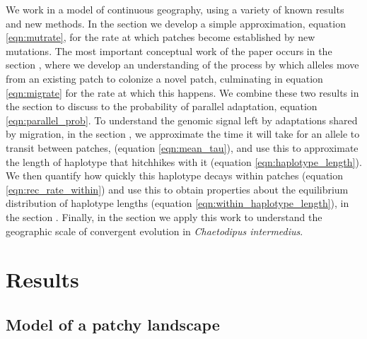 \documentclass{article}
\begin{document}
We work in a model of continuous geography,
using a variety of known results and new methods.
In the section  we develop a simple approximation,
equation \eqref{eqn:mutrate}, for the rate at which patches become established by new mutations. 
The most important conceptual work of the paper occurs in the section ,
where we develop an understanding of the process by which alleles move from an existing patch 
to colonize a novel patch, culminating in equation \eqref{eqn:migrate} for the rate at which this happens.
We combine these two results in the section  
to discuss to the probability of parallel adaptation, equation \eqref{eqn:parallel_prob}.
To understand the genomic signal left by adaptations shared by migration, 
in the section , 
we approximate the time it will take for an allele to transit between patches,
(equation \eqref{eqn:mean_tau}),
and use this to approximate the length of haplotype that hitchhikes with it (equation \eqref{eqn:haplotype_length}). 
We then quantify how quickly this haplotype decays within patches (equation \eqref{eqn:rec_rate_within}) 
and use this to obtain properties about the equilibrium distribution of haplotype lengths 
(equation \eqref{eqn:within_haplotype_length}), in the section . 
Finally, in the section  we apply this work to understand the geographic scale of
convergent evolution in \textit{Chaetodipus intermedius}. 



\section*{Results}

\subsection{Model of a patchy landscape}
\label{ss:patchyspace}
\end{document}
